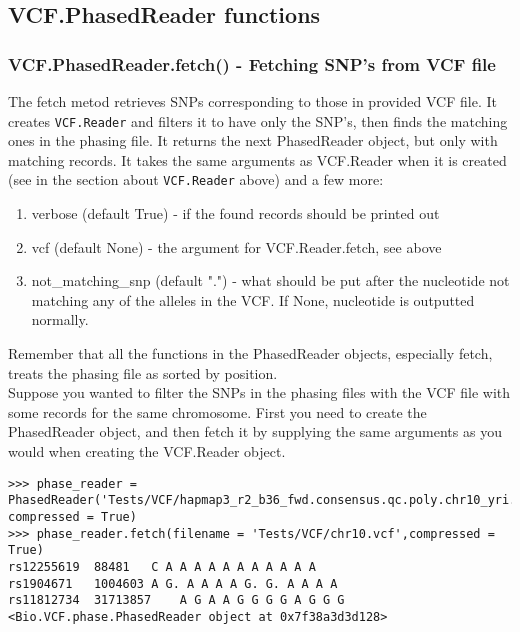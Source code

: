 \subsection{VCF.PhasedReader functions}

\subsubsection{VCF.PhasedReader.fetch() - Fetching SNP's from VCF file}

\noindent The fetch metod retrieves SNPs corresponding to those in provided VCF file. It creates \verb|VCF.Reader|
and filters it to have only the SNP's, then finds the matching ones in the phasing file. It returns the next PhasedReader object, but only with matching records.
It takes the same arguments as VCF.Reader when it is created (see in the section about \verb|VCF.Reader| above) and a few more:

\begin{enumerate}
  \item verbose (default True) - if the found records should be printed out
  \item vcf (default None) - the argument for VCF.Reader.fetch, see above
  \item not\_matching\_snp (default ".") - what should be put after the nucleotide not matching any of the alleles in the VCF.
  If None, nucleotide is outputted normally.
\end{enumerate}

\noindent Remember that all the functions in the PhasedReader objects, especially fetch, treats the phasing file as sorted by position.
\\

\noindent Suppose you wanted to filter the SNPs in the phasing files with the VCF file with some records for the same chromosome.
First you need to create the PhasedReader object, and then fetch it by supplying the same arguments as you would when creating the VCF.Reader object.

\begin{verbatim}
>>> phase_reader = PhasedReader('Tests/VCF/hapmap3_r2_b36_fwd.consensus.qc.poly.chr10_yri.D.phased.gz',
compressed = True)
>>> phase_reader.fetch(filename = 'Tests/VCF/chr10.vcf',compressed = True)
rs12255619	88481	C A A A A A A A A A A A
rs1904671	1004603	A G. A A A A G. G. A A A A
rs11812734	31713857	A G A A G G G G A G G G
<Bio.VCF.phase.PhasedReader object at 0x7f38a3d3d128>
\end{verbatim}

